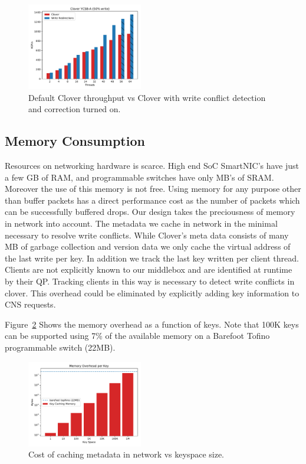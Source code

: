 \begin{figure}
    \includegraphics[width=0.45\textwidth]{fig/throughput.pdf}
    \caption{Default Clover throughput vs Clover with write conflict
    detection and correction turned on.}
    \label{fig:conflicts}
\end{figure}

\subsection{Memory Consumption}

Resources on networking hardware is scarce. High end SoC SmartNIC's
have just a few GB of RAM, and programmable switches have only MB's of
SRAM. Moreover the use of this memory is not free. Using memory for
any purpose other than buffer packets has a direct performance cost as
the number of packets which can be successfully buffered drops. Our
design takes the preciousness of memory in network into account. The
metadata we cache in network in the minimal necessary to resolve write
conflicts. While Clover's meta data consists of many MB of garbage
collection and version data we only cache the virtual address of the
last write per key. In addition we track the last key written per
client thread. Clients are not explicitly known to our middlebox and
are identified at runtime by their QP. Tracking clients in this way is
necessary to detect write conflicts in clover. This overhead could be
eliminated by explicitly adding key information to CNS requests.

Figure~\ref{fig:memory} Shows the memory overhead as a function of
keys. Note that 100K keys can be supported using 7\% of the available
memory on a Barefoot Tofino programmable switch (22MB).

\begin{figure}
    \includegraphics[width=0.45\textwidth]{fig/memory.pdf}
    \caption{Cost of caching metadata in network vs keyspace size.}
    \label{fig:memory}
\end{figure}

